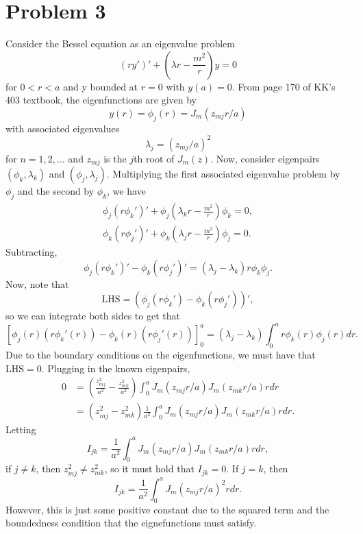 \documentclass{article}
\begin{document}
\section{Problem 3}
Consider the Bessel equation as an eigenvalue problem
\[
(ry')'+\left(\lambda r-\frac{m^2}{r}\right)y=0
\]
for $0<r<a$ and y bounded at $r=0$ with $y(a)=0$. From page 170 of KK's 403 textbook, the eigenfunctions are given by 
\[
y(r)=\phi_j(r)=J_m(z_{mj}r/a)
\]
with associated eigenvalues 
\[
\lambda_j=(z_{mj}/a)^2
\]
for $n=1,2,\ldots$ and $z_{mj}$ is the $j$th root of $J_m(z)$. Now, consider eigenpairs $(\phi_k,\lambda_k)$ and $(\phi_j,\lambda_j)$. Multiplying the first associated eigenvalue problem by $\phi_j$ and the second by $\phi_k$, we have 
\begin{align*}
\phi_j(r\phi_k')'+\phi_j\left(\lambda_k r-\frac{m^2}{r}\right)\phi_k=0,\\
\phi_k(r\phi_j')'+\phi_k\left(\lambda_j r-\frac{m^2}{r}\right)\phi_j=0.
\end{align*}
Subtracting, 
\[
\phi_j(r\phi_k')'-\phi_k(r\phi_j')'=(\lambda_j-\lambda_k)r\phi_k\phi_j.
\]
Now, note that 
\[
\text{LHS}=(\phi_j(r\phi_k')-\phi_k(r\phi_j'))',
\]
so we can integrate both sides to get that
\[
\left[\phi_j(r)(r\phi_k'(r))-\phi_k(r)(r\phi_j'(r))\right]_0^a=(\lambda_j-\lambda_k)\int_{0}^{a}r\phi_k(r)\phi_j(r)dr.
\]
Due to the boundary conditions on the eigenfunctions, we must have that $\text{LHS}=0$. Plugging in the known eigenpairs,
\begin{align*}
0&=\left(\frac{z_{mj}^2}{a^2}-\frac{z_{mk}^2}{a^2}\right)\int_{0}^aJ_m(z_{mj}r/a)J_m(z_{mk}r/a)rdr\\&=
(z_{mj}^2-z_{mk}^2)\frac{1}{a^2}\int_{0}^aJ_m(z_{mj}r/a)J_m(z_{mk}r/a)rdr.
\end{align*}
Letting 
\[
I_{jk}=\frac{1}{a^2}\int_{0}^aJ_m(z_{mj}r/a)J_m(z_{mk}r/a)rdr,
\]
if $j\neq k$, then $z^2_{mj}\neq z^2_{mk}$, so it must hold that $I_{jk}=0$. If $j=k$, then
\[
I_{jk}=\frac{1}{a^2}\int_{0}^aJ_m(z_{mj}r/a)^2rdr.
\]
However, this is just some positive constant due to the squared term and the boundedness condition that the eignefunctions must satisfy. 
\end{document}
